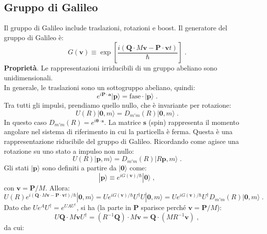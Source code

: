 \documentclass[12pt,a4paper]{report}
\theoremstyle{definition}
\numberwithin{equation}{section}
\newcommand{\ket}{\rangle}
\newcommand{\adj}[1]{#1^{\dagger}}
\begin{document}
\subsection{Gruppo di Galileo}
Il gruppo di Galileo include traslazioni, rotazioni e boost. Il generatore del gruppo di Galileo è:
\begin{equation}
G(\mathbf{v})\equiv\exp\left[\frac{i(\mathbf{Q}\cdot M\mathbf{v}-\mathbf{P}\cdot\mathbf{v}t)}{\hbar}\right]\;.
\end{equation}
\textbf{Proprietà}. Le rappresentazioni irriducibili di un gruppo abeliano sono unidimensionali. \\
In generale, le traslazioni sono un sottogruppo abeliano, quindi:
\begin{equation}
e^{i\mathbf{P}\cdot\mathbf{a}}|\mathbf{p}\ket=\mathrm{fase}\cdot|\mathbf{p}\ket\;.
\end{equation}
Tra tutti gli impulsi, prendiamo quello nullo, che è invariante per rotazione:
\begin{equation}
U(R)|\mathbf{0},m\ket=D_{m'm}(R)|\mathbf{0},m\ket\;.
\end{equation}
In questo caso $D_{m'm}(R)=e^{i\boldsymbol{\theta}\cdot \mathbf{s}}$. La matrice $\mathbf{s}$ (spin) rappresenta il momento angolare nel sistema di riferimento in cui la particella è ferma. Questa è una rappresentazione riducibile del gruppo di Galileo. Ricordando come agisce una rotazione su uno stato a impulso non nullo:
\begin{equation}
U(R)|\mathbf{p},m\ket=D_{m'm}(R)|R\mathbf{p},m\ket\;.
\end{equation}
Gli stati $|\mathbf{p}\ket$ sono definiti a partire da $|\mathbf{0}\ket$ come:
\begin{equation}
|\mathbf{p}\ket\equiv e^{iG(\mathbf{v})/\hbar}|\mathbf{0}\ket\;,
\end{equation}
con $\mathbf{v}=\mathbf{P}/M$. Allora:
\begin{equation}
U(R)e^{i(\mathbf{Q}\cdot M\mathbf{v}-\mathbf{P}\cdot\mathbf{v}t)/\hbar}|\mathbf{0},m\ket= Ue^{iG(\mathbf{v})/\hbar}\adj{U}U|\mathbf{0},m\ket=Ue^{iG(\mathbf{v})/\hbar}\adj{U}D_{m'm}(R)|\mathbf{0},m\ket\;.
\end{equation}
Dato che $Ue^A\adj{U}=e^{UA\adj{U}}$, si ha (la parte in $\mathbf{P}$ sparisce perché $\mathbf{v}=\mathbf{P}/M$):
\begin{equation}
U\mathbf{Q}\cdot M\mathbf{v}\adj{U}=(R^{-1}\mathbf{Q})\cdot M\mathbf{v}=\mathbf{Q}\cdot (MR^{-1}\mathbf{v})\;,
\end{equation}
da cui:
\end{document}
